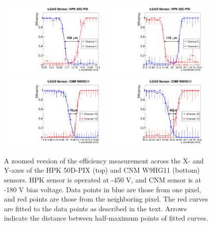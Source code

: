 \documentclass[preprint,1p]{elsarticle}
\begin{document}
\begin{figure}[!htbp] 
\centering
\includegraphics[width=0.48\textwidth]{figs/UCSCBoard_HPK50CPix_CNM_W9HG11_Runs838-839-841/Eff_vs_X_HPK50CPIX_Ch1_4_fit.pdf} 
\includegraphics[width=0.48\textwidth]{figs/UCSCBoard_HPK50CPix_CNM_W9HG11_Runs838-839-841/Eff_vs_Y_HPK50CPIX_Ch3_4_fit.pdf} 
\includegraphics[width=0.48\textwidth]{figs/UCSCBoard_HPK50CPix_CNM_W9HG11_Runs838-839-841/Eff_vs_X_CNM_Ch10_13_fit.pdf} 
\includegraphics[width=0.48\textwidth]{figs/UCSCBoard_HPK50CPix_CNM_W9HG11_Runs838-839-841/Eff_vs_Y_CNM_Ch13_12_fit.pdf} 
\caption{A zoomed version of the efficiency measurement across the X- and Y-axes of the HPK 50D-PIX (top) and CNM W9HG11 (bottom) sensors. HPK sensor is operated at -450 V, and CNM sensor is at -180 V bias voltage. Data points in blue are those from one pixel, and red points are those from the neighboring pixel. The red curves are fitted to the data points as described in the text. Arrows indicate the distance between half-maximum points of fitted curves.} 
\label{fig:UCSC_HPK50C_CNM_ZoomeffXY} 
\end{figure} 
\end{document}

